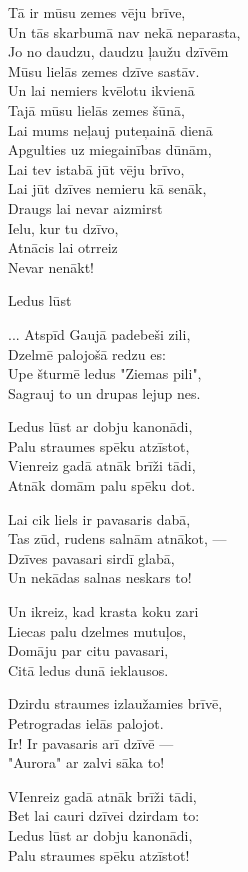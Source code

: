\documentclass[14pt]{extarticle}
\begin{document}
{{Tā ir mūsu zemes vēju brīve,\\
Un tās skarbumā nav nekā neparasta,\\
Jo no daudzu, daudzu ļaužu dzīvēm\\
Mūsu lielās zemes dzīve sastāv.\\
Un lai nemiers kvēlotu ikvienā\\
Tajā mūsu lielās zemes šūnā,\\
Lai mums neļauj puteņainā dienā\\
Apgulties uz miegainības dūnām,\\
Lai tev istabā jūt vēju brīvo,\\
Lai jūt dzīves nemieru kā senāk,\\
Draugs lai nevar aizmirst\\
Ielu, kur tu dzīvo,\\
Atnācis lai otrreiz\\
Nevar nenākt!

\newpage

{\large \sc Ledus lūst}

... Atspīd Gaujā padebeši zili,\\
Dzelmē palojošā redzu es:\\
Upe šturmē ledus "Ziemas pili",\\
Sagrauj to un drupas lejup nes.

Ledus lūst ar dobju kanonādi,\\
Palu straumes spēku atzīstot,\\
Vienreiz gadā atnāk brīži tādi,\\
Atnāk domām palu spēku dot.

Lai cik liels ir pavasaris dabā,\\
Tas zūd, rudens salnām atnākot, ---\\
Dzīves pavasari sirdī glabā,\\
Un nekādas salnas neskars to!

Un ikreiz, kad krasta koku zari\\
Liecas palu dzelmes mutuļos,\\
Domāju par citu pavasari,\\
Citā ledus dunā ieklausos.

Dzirdu straumes izlaužamies brīvē,\\
Petrogradas ielās palojot.\\
Ir! Ir pavasaris arī dzīvē ---\\
"Aurora" ar zalvi sāka to!

VIenreiz gadā atnāk brīži tādi,\\
Bet lai cauri dzīvei dzirdam to:\\
Ledus lūst ar dobju kanonādi,\\
Palu straumes spēku atzīstot!


}}
\end{document}
